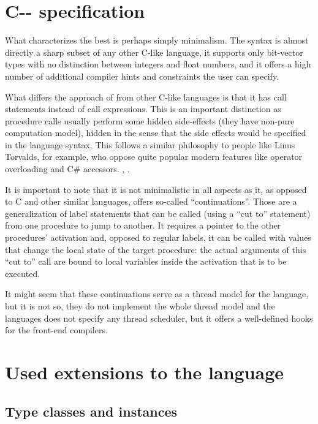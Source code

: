 \section{C-{}- specification}

What characterizes \cmm the best is perhaps simply minimalism. The syntax is almost directly a sharp subset of any other C-like language, it supports only bit-vector types with no distinction between integers and float numbers, and it offers a high number of additional compiler hints and constraints the user can specify.

What differs the approach of \cmm from other C-like languages is that it has call statements instead of call expressions. This is an important distinction as procedure calls usually perform some hidden side-effects (they have non-pure computation model), hidden in the sense that the side effects would be specified in the language syntax. This follows a similar philosophy to people like Linus Torvalds, for example, who oppose quite popular modern features like operator overloading and C\# accessors. , .

It is important to note that \cmm it is not minimalistic in all aspects as it, as opposed to C and other similar languages, offers so-called ``continuations''. Those are a generalization of label statements that can be called (using a ``cut to'' statement) from one procedure to jump to another. It requires a pointer to the other procedures' activation and, opposed to regular labels, it can be called with values that change the local state of the target procedure: the actual arguments of this ``cut to'' call are bound to local variables inside the activation that is to be executed.

It might seem that these continuations serve as a thread model for the language, but it is not so, they do not implement the whole thread model and the languages does not specify any thread scheduler, but it offers a well-defined hooks for the front-end compilers.



\section{Used extensions to the language}


\subsection{Type classes and instances}

